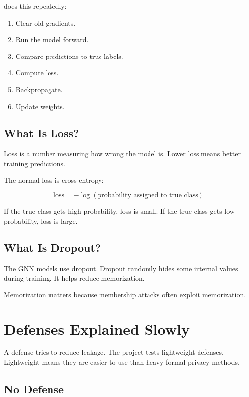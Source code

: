 \documentclass[11pt,a4paper]{article}
\newcommand{\code}[1]{\texttt{\detokenize{#1}}}
\begin{document}
\code{train_gnn} does this repeatedly:

\begin{enumerate}
  \item Clear old gradients.
  \item Run the model forward.
  \item Compare predictions to true labels.
  \item Compute loss.
  \item Backpropagate.
  \item Update weights.
\end{enumerate}

\subsection{What Is Loss?}

Loss is a number measuring how wrong the model is. Lower loss means better training predictions.

The normal loss is cross-entropy:

\[
\text{loss} = -\log(\text{probability assigned to true class})
\]

If the true class gets high probability, loss is small. If the true class gets low probability, loss is large.

\subsection{What Is Dropout?}

The GNN models use dropout. Dropout randomly hides some internal values during training. It helps reduce memorization.

Memorization matters because membership attacks often exploit memorization.

\section{Defenses Explained Slowly}

A defense tries to reduce leakage. The project tests lightweight defenses. Lightweight means they are easier to use than heavy formal privacy methods.

\subsection{No Defense}
\end{document}
